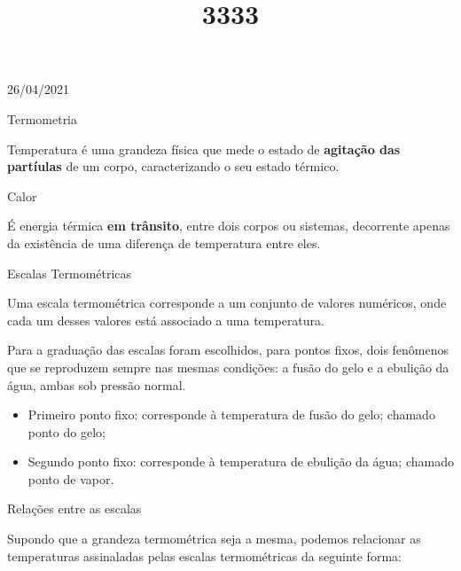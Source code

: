 \documentclass{SchoolBook}
\begin{document}
    \begin{day}{26/04/2021}
        \title{3}{Termometria}
        
        Temperatura é uma grandeza física que mede o estado de \textbf{agitação das partíulas} de um corpo, caracterizando o seu estado térmico.
        
        \title{3}{Calor}
        
        É energia térmica \textbf{em trânsito}, entre dois corpos ou sistemas, decorrente apenas da existência de uma diferença de temperatura entre eles.
        
        \title{3}{Escalas Termométricas}
        
        Uma escala termométrica corresponde a um conjunto de valores numéricos, onde cada um desses valores está associado a uma temperatura.
        
        Para a graduação das escalas foram escolhidos, para pontos fixos, dois fenômenos que se reproduzem sempre nas mesmas condições: a fusão do gelo e a ebulição da água, ambas sob pressão normal.
        
        \vspace{3pt}
        \begin{itemize}[nosep]
            \item Primeiro ponto fixo: corresponde à temperatura de fusão do gelo; chamado ponto do gelo;
            \item Segundo ponto fixo: corresponde à temperatura de ebulição da água; chamado ponto de vapor.
        \end{itemize}
        
        \title{3}{Relações entre as escalas}
        
        Supondo que a grandeza termométrica seja a mesma, podemos relacionar as temperaturas assinaladas pelas escalas termométricas da seguinte forma:
        \vspace{6pt}
        
\end{day}
\end{document}
